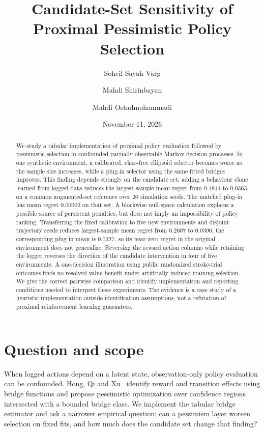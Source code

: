 \documentclass[11pt]{article}
\title{Candidate-Set Sensitivity of Proximal Pessimistic Policy Selection}
\author{Soheil Sayah Varg \and Mahdi Shirinbayan \and Mahdi Ostadmohammadi}
\date{November 11, 2026}
\begin{document}
\maketitle
\begin{abstract}
We study a tabular implementation of proximal policy evaluation followed by
pessimistic selection in confounded partially observable Markov decision
processes. In one synthetic environment, a calibrated, class-free ellipsoid
selector becomes worse as the sample size increases, while a plug-in selector
using the same fitted bridges improves. This finding depends strongly on the
candidate set: adding a behaviour clone learned from logged data reduces
the largest-sample mean regret from $0.1814$ to $0.0363$ on a common
augmented-set reference over 20 simulation seeds. The matched plug-in has mean
regret $0.00002$ on that set. A blockwise null-space calculation explains a possible source
of persistent penalties, but does not imply an impossibility of policy ranking.
Transferring the fixed calibration to five new environments and disjoint
trajectory seeds reduces largest-sample mean regret from $0.2607$ to $0.0396$;
the corresponding plug-in mean is $0.0327$, so its near-zero regret in the
original environment does not generalize.
Reversing the reward action columns while retaining the logger reverses the
direction of the candidate intervention in four of five environments.
A one-decision illustration using public randomized stroke-trial outcomes
finds no resolved value benefit under artificially induced training selection.
We give the correct pairwise comparison and identify implementation and
reporting conditions needed to interpret these experiments. The evidence is a
case study of a heuristic implementation outside identification assumptions,
not a refutation of proximal reinforcement learning guarantees.
\end{abstract}

\section{Question and scope}
When logged actions depend on a latent state, observation-only policy
evaluation can be confounded. Hong, Qi and Xu~\cite{hong} identify reward and
transition effects using bridge functions and propose pessimistic optimization
over confidence regions intersected with a bounded bridge class. We implement
the tabular bridge estimator and ask a narrower empirical question: can a
pessimism layer worsen selection on fixed fits, and how much does the candidate
set change that finding?
\end{document}
